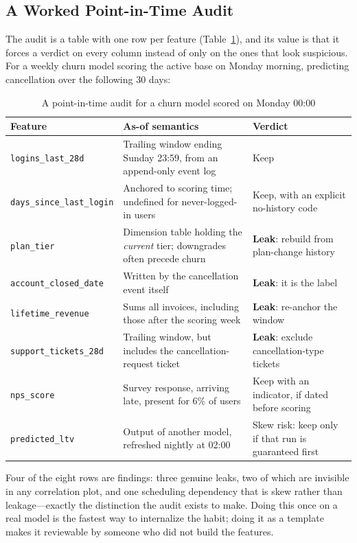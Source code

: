 \subsection{A Worked Point-in-Time Audit}

The audit is a table with one row per feature (Table~\ref{cml:tab:pit_audit}), and its value is that it forces a verdict on every column instead of only on the ones that look suspicious. For a weekly churn model scoring the active base on Monday morning, predicting cancellation over the following 30 days:

\begin{table}[H]
\centering
\small
\caption{A point-in-time audit for a churn model scored on Monday 00:00}
\label{cml:tab:pit_audit}
\begin{tabularx}{\textwidth}{lXX}
\toprule
\textbf{Feature} & \textbf{As-of semantics} & \textbf{Verdict} \\
\midrule
\texttt{logins\_last\_28d} & Trailing window ending Sunday 23:59, from an append-only event log & Keep \\
\texttt{days\_since\_last\_login} & Anchored to scoring time; undefined for never-logged-in users & Keep, with an explicit no-history code \\
\texttt{plan\_tier} & Dimension table holding the \emph{current} tier; downgrades often precede churn & \textbf{Leak}: rebuild from plan-change history \\
\texttt{account\_closed\_date} & Written by the cancellation event itself & \textbf{Leak}: it is the label \\
\texttt{lifetime\_revenue} & Sums all invoices, including those after the scoring week & \textbf{Leak}: re-anchor the window \\
\texttt{support\_tickets\_28d} & Trailing window, but includes the cancellation-request ticket & \textbf{Leak}: exclude cancellation-type tickets \\
\texttt{nps\_score} & Survey response, arriving late, present for 6\% of users & Keep with an indicator, if dated before scoring \\
\texttt{predicted\_ltv} & Output of another model, refreshed nightly at 02:00 & Skew risk: keep only if that run is guaranteed first \\
\bottomrule
\end{tabularx}
\end{table}

Four of the eight rows are findings: three genuine leaks, two of which are invisible in any correlation plot, and one scheduling dependency that is skew rather than leakage---exactly the distinction the audit exists to make. Doing this once on a real model is the fastest way to internalize the habit; doing it as a template makes it reviewable by someone who did not build the features.

